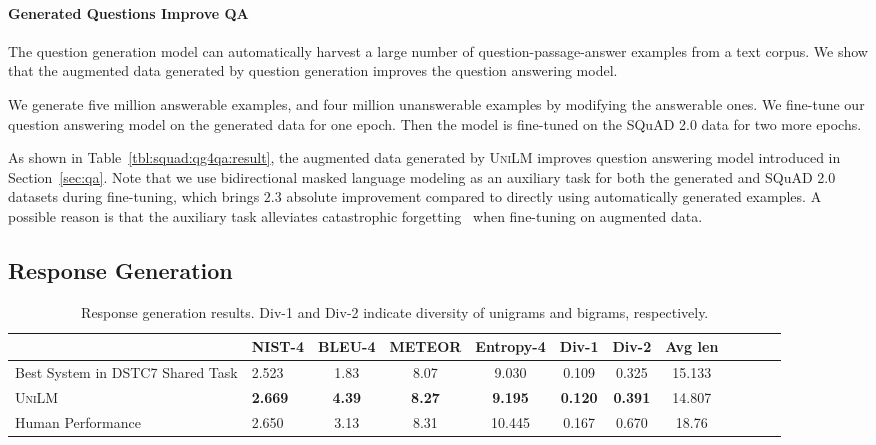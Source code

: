 \documentclass{article}
\newcommand\ours{\textsc{UniLM}}
\begin{document}
\paragraph{Generated Questions Improve QA}

The question generation model can automatically harvest a large number of question-passage-answer examples from a text corpus.
We show that the augmented data generated by question generation improves the question answering model.

We generate five million answerable examples, and four million unanswerable examples by modifying the answerable ones.
We fine-tune our question answering model on the generated data for one epoch. Then the model is fine-tuned on the SQuAD 2.0 data for two more epochs. 

As shown in Table~\ref{tbl:squad:qg4qa:result}, the augmented data generated by \ours{} improves question answering model introduced in Section~\ref{sec:qa}.
Note that we use bidirectional masked language modeling as an auxiliary task for both the generated and SQuAD 2.0 datasets during fine-tuning, which brings $2.3$ absolute improvement compared to directly using automatically generated examples. A possible reason is that the auxiliary task alleviates catastrophic forgetting~\cite{general:ling:intell} when fine-tuning on augmented data.


\subsection{Response Generation}

\begin{table}[t]
\centering
\small
\begin{tabular}{@{ \hskip2pt}l @{ \hskip2pt}l@{ \hskip2pt} @{ \hskip2pt}c@{ \hskip2pt} @{ \hskip2pt}c@{ \hskip2pt} @{ \hskip2pt}c@{ \hskip2pt} @{ \hskip2pt}c@{ \hskip2pt} @{ \hskip2pt}c@{ \hskip2pt} @{ \hskip1pt}c@{ \hskip1pt} @{ \hskip1pt}c @{ \hskip1pt} @{ \hskip1pt} c@{ \hskip1pt}  @{ \hskip2pt} c@{ \hskip2pt} @{ \hskip2pt} c@{ \hskip2pt}}
\toprule
& NIST-4    & BLEU-4 & METEOR & Entropy-4 & Div-1 & Div-2 & Avg len \\ \midrule
Best System in DSTC7 Shared Task & 2.523 & 1.83  & 8.07 & 9.030 & 0.109 & 0.325& 15.133 \\
\ours & \textbf{2.669} & \textbf{4.39} & \textbf{8.27} & \textbf{9.195} & \textbf{0.120} & \textbf{0.391} & 14.807 \\
\midrule
Human Performance & 2.650 & 3.13 & 8.31 & 10.445 & 0.167 & 0.670 & 18.76 \\
\bottomrule
\end{tabular}
\caption{Response generation results. Div-1 and Div-2 indicate diversity of unigrams and bigrams, respectively.}
\label{tbl:dgrg:result}
\end{table}
\end{document}

